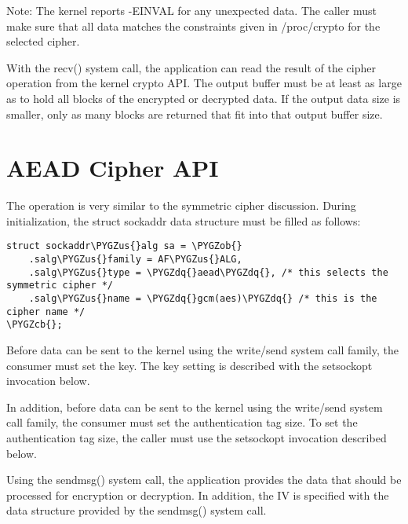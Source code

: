 \documentclass[a4paper,8pt,english]{sphinxmanual}
\def\PYGZus{\char`\_}
\def\PYGZob{\char`\{}
\def\PYGZcb{\char`\}}
\def\PYGZdq{\char`\"}
\begin{document}
Note: The kernel reports -EINVAL for any unexpected data. The caller
must make sure that all data matches the constraints given in
/proc/crypto for the selected cipher.

With the recv() system call, the application can read the result of the
cipher operation from the kernel crypto API. The output buffer must be
at least as large as to hold all blocks of the encrypted or decrypted
data. If the output data size is smaller, only as many blocks are
returned that fit into that output buffer size.


\section{AEAD Cipher API}
\label{crypto/userspace-if:aead-cipher-api}
The operation is very similar to the symmetric cipher discussion. During
initialization, the struct sockaddr data structure must be filled as
follows:

\begin{Verbatim}[commandchars=\\\{\}]
struct sockaddr\PYGZus{}alg sa = \PYGZob{}
    .salg\PYGZus{}family = AF\PYGZus{}ALG,
    .salg\PYGZus{}type = \PYGZdq{}aead\PYGZdq{}, /* this selects the symmetric cipher */
    .salg\PYGZus{}name = \PYGZdq{}gcm(aes)\PYGZdq{} /* this is the cipher name */
\PYGZcb{};
\end{Verbatim}

Before data can be sent to the kernel using the write/send system call
family, the consumer must set the key. The key setting is described with
the setsockopt invocation below.

In addition, before data can be sent to the kernel using the write/send
system call family, the consumer must set the authentication tag size.
To set the authentication tag size, the caller must use the setsockopt
invocation described below.

Using the sendmsg() system call, the application provides the data that
should be processed for encryption or decryption. In addition, the IV is
specified with the data structure provided by the sendmsg() system call.
\end{document}
